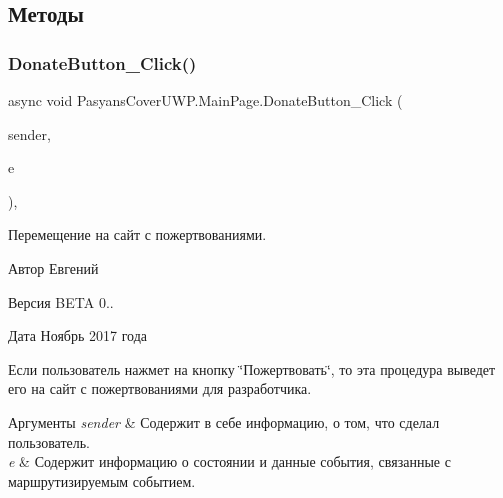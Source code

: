 \subsection{Методы}
\mbox{\label{class_pasyans_cover_u_w_p_1_1_main_page_a92a5ab8e2a6a3ca7faa9b2e75de9feb9}} 
\subsubsection{\texorpdfstring{Donate\+Button\+\_\+\+Click()}{DonateButton\_Click()}}
{\footnotesize\ttfamily async void Pasyans\+Cover\+U\+W\+P.\+Main\+Page.\+Donate\+Button\+\_\+\+Click (\begin{DoxyParamCaption}\item[{object}]{sender,  }\item[{Routed\+Event\+Args}]{e }\end{DoxyParamCaption})\hspace{0.3cm}{\ttfamily [inline]}, {\ttfamily [private]}}



Перемещение на сайт с пожертвованиями. 

\begin{DoxyAuthor}{Автор}
Евгений 
\end{DoxyAuthor}
\begin{DoxyVersion}{Версия}
B\+E\+TA 0.. 
\end{DoxyVersion}
\begin{DoxyDate}{Дата}
Ноябрь 2017 года
\end{DoxyDate}
Если пользователь нажмет на кнопку \char`\"{}Пожертвовать\char`\"{}, то эта процедура выведет его на сайт с пожертвованиями для разработчика. 
\begin{DoxyParams}{Аргументы}
{\em sender} & Содержит в себе информацию, о том, что сделал пользователь. \\
\hline
{\em e} & Содержит информацию о состоянии и данные события, связанные с маршрутизируемым событием. \\
\hline
\end{DoxyParams}
\mbox{\label{class_pasyans_cover_u_w_p_1_1_main_page_a241f1356524ae67f597c7f70b9fc7bee}} 
